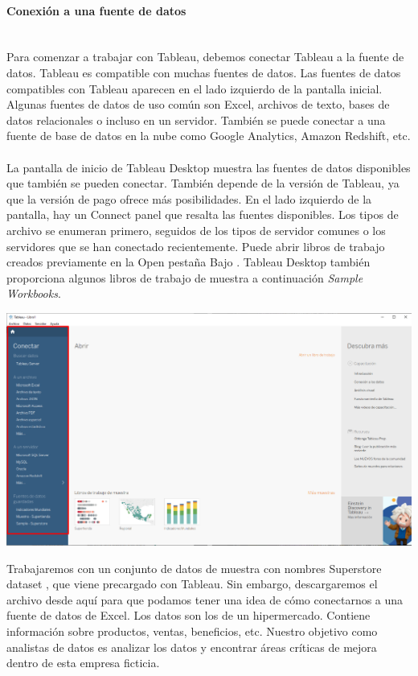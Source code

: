 \documentclass[12pt,letterpaper]{article}
\begin{document}
    \paragraph{\large Conexión a una fuente de datos\\ \\}
    Para comenzar a trabajar con Tableau, debemos conectar Tableau a la fuente de datos. Tableau es compatible con muchas fuentes de datos. Las fuentes de datos compatibles con Tableau aparecen en el lado izquierdo de la pantalla inicial. Algunas fuentes de datos de uso común son Excel, archivos de texto, bases de datos relacionales o incluso en un servidor. También se puede conectar a una fuente de base de datos en la nube como Google Analytics, Amazon Redshift, etc.\\ \\
    La pantalla de inicio de Tableau Desktop muestra las fuentes de datos disponibles que también se pueden conectar. También depende de la versión de Tableau, ya que la versión de pago ofrece más posibilidades. En el lado izquierdo de la pantalla, hay un Connect panel que resalta las fuentes disponibles. Los tipos de archivo se enumeran primero, seguidos de los tipos de servidor comunes o los servidores que se han conectado recientemente. Puede abrir libros de trabajo creados previamente en la Open pestaña Bajo . Tableau Desktop también proporciona algunos libros de trabajo de muestra a continuación \textit{Sample Workbooks}.
    \begin{center}
        \includegraphics[width=16cm]{./img/img3.png}
    \end{center}
    Trabajaremos con un conjunto de datos de muestra con nombres Superstore dataset , que viene precargado con Tableau. Sin embargo, descargaremos el archivo desde aquí para que podamos tener una idea de cómo conectarnos a una fuente de datos de Excel. Los datos son los de un hipermercado. Contiene información sobre productos, ventas, beneficios, etc. Nuestro objetivo como analistas de datos es analizar los datos y encontrar áreas críticas de mejora dentro de esta empresa ficticia.
\end{document}
